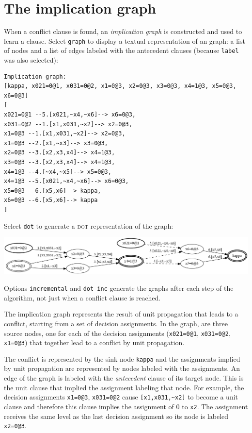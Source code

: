 \documentclass[11pt]{report}
\newcommand*{\p}[1]{\textup{\texttt{#1}}}
\newcommand*{\dt}{\textsc{dot}}
\begin{document}
\clearpage

\section{The implication graph}

When a conflict clause is found, an \emph{implication graph} is
constructed and used to learn a clause. Select \p{graph} to display a
textual representation of an graph: a list of nodes and a list of
edges labeled with the antecedent clauses (because \p{label} was also
selected):

\begin{verbatim}
Implication graph:
[kappa, x021=0@1, x031=0@2, x1=0@3, x2=0@3, x3=0@3, x4=1@3, x5=0@3, x6=0@3]
[
x021=0@1 --5.[x021,~x4,~x6]--> x6=0@3,
x031=0@2 --1.[x1,x031,~x2]--> x2=0@3,
x1=0@3 --1.[x1,x031,~x2]--> x2=0@3,
x1=0@3 --2.[x1,~x3]--> x3=0@3,
x2=0@3 --3.[x2,x3,x4]--> x4=1@3,
x3=0@3 --3.[x2,x3,x4]--> x4=1@3,
x4=1@3 --4.[~x4,~x5]--> x5=0@3,
x4=1@3 --5.[x021,~x4,~x6]--> x6=0@3,
x5=0@3 --6.[x5,x6]--> kappa,
x6=0@3 --6.[x5,x6]--> kappa
]
\end{verbatim}

Select \p{dot} to generate a \dt{} representation of the
graph:

\begin{center}
\includegraphics[keepaspectratio=true,width=\textwidth]{graph-bw}
\end{center}

Options \p{incremental} and \p{dot\_inc} generate the graphs after each
step of the algorithm, not just when a conflict clause is reached.

The implication graph represents the result of unit propagation that
leads to a conflict, starting from a set of decision assignments. In the
graph, are three source nodes, one for each of the decision assignments
(\p{x021=0@1}, \p{x031=0@2}, \p{x1=0@3}) that together lead to a
conflict by unit propagation.

The conflict is represented by the sink node \p{kappa} and the
assignments implied by unit propagation are represented by nodes labeled
with the assignments. An edge of the graph is labeled with the
\emph{antecedent} clause of its target node. This is the unit clause
that implied the assignment labeling that node. For example, the
decision assignments \p{x1=0@3}, \p{x031=0@2} cause \verb+[x1,x031,~x2]+
to become a unit clause and therefore this clause implies the assignment
of 0 to \p{x2}. The assignment receives the same level as the last
decision assignment so its node is labeled \p{x2=0@3}.
\end{document}
